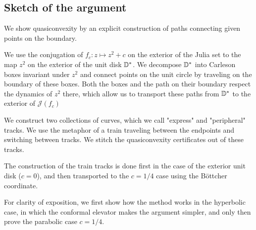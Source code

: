 \begin{comment}
Thus, for any $c$ in 

For values $c$ in quadratic polynomials $f_{c}(z)=z^{2}+c$
\end{comment}
\begin{comment}
If $f_{c}$ has an attracting fixed point then its Julia set $\mathcal{J}(f_{c})$
is a quasicircle, hence its interior and exterior are both quasiconvex.
This is the case for values of $c$ in the main cardioid of the Mandelbrot
set.
\end{comment}
\begin{comment}
, i.e. for 
\[
c\in\left\{ -\frac{\lambda}{2}-\frac{\lambda^{2}}{4}:\,\left|\lambda\right|<1\right\} .
\]
\end{comment}

\subsection{Sketch of the argument}

We show quasiconvexity by an explicit construction of paths connecting
given points on the boundary.\textbf{}

We use the conjugation of $f_{c}:z\mapsto z^{2}+c$ on the exterior
of the Julia set to the map $z^{2}$ on the exterior of the unit disk
$\mathbb{D}^{*}$. We decompose $\mathbb{D}^{*}$ into Carleson boxes invariant under
$z^{2}$ and connect points on the unit circle by traveling on the
boundary of these boxes. Both the boxes and the path on their boundary
respect the dynamics of $z^{2}$ there, which allow us to transport
these paths from $\mathbb{D}^{*}$ to the exterior of $\mathcal{J}(f_{c})$ 

We construct two collections of curves, which we call "express"
and "peripheral" tracks. We use the metaphor
of a train traveling between the endpoints and switching between tracks.
We stitch the quasiconvexity certificates out of these tracks.

The construction of the train tracks is done first in the case of
the exterior unit disk ($c=0$), and then transported to the 
$c=1/4$ case using the Böttcher coordinate. 

For clarity of exposition, we first show how the method works in the hyperbolic case, in which the conformal elevator makes the argument
simpler, and only then prove the parabolic case $c=1/4$. 


